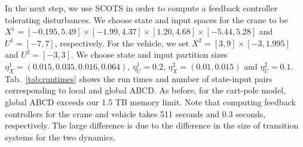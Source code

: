 In the next step, we use SCOTS in order to compute a feedback controller tolerating disturbances. 
We choose state and input spaces for the crane to be $X^{1}=[-0.195,5.49]\times[-1.99,4.37]\times[1.20,4.68]\times[-5.44,5.28]$ and $U^{1}=[-7,7]$, respectively. For the vehicle, we set $X^{2}=[3,9]\times[-3,1.995]$ and $U^{2}=[-3,3]$. %
We choose state and input partition sizes $\eta_{{X}}^{1}=(0.015,0.035,0.016,0.064)$, $\eta_{U}^1=0.2$,  $\eta_{{X}}^2=(0.01,0.015)$ and $\eta_{U}^2=0.1$. %
Tab.~\ref{tab:runtimes} shows the run times and number of state-input pairs corresponding to local and global ABCD. 
As before, for the cart-pole model, global ABCD exceeds our 1.5 TB  memory limit. 
Note that computing feedback controllers for the crane and vehicle takes 511 seconds and 0.3 seconds, respectively. 
The large difference is due to the difference in the size of transition systems for the two dynamics. 

			


